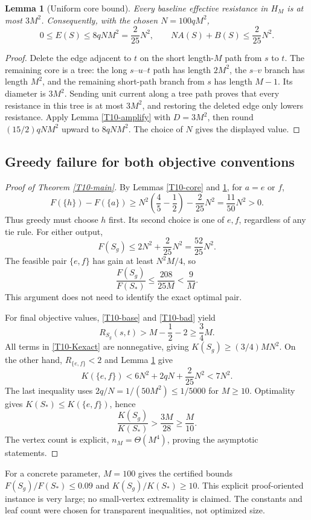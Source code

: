 \documentclass[11pt,a4paper]{article}
\newtheorem{lemma}[theorem]{Lemma}
\theoremstyle{definition}\newtheorem{definition}[theorem]{Definition}
\theoremstyle{remark}\newtheorem{remark}[theorem]{Remark}
\numberwithin{equation}{section}
\begin{document}
\begin{lemma}[Uniform core bound]\label{T10-diam}
Every baseline effective resistance in $H_M$ is at most $3M^2$. Consequently, with the chosen $N=100qM^2$,
\[
 0\le E(S)\le8qNM^2=\frac{2}{25}N^2,
 \qquad NA(S)+B(S)\le\frac{2}{25}N^2.
\]
\end{lemma}
\begin{proof}
Delete the edge adjacent to $t$ on the short length-$M$ path from $s$ to $t$. The remaining core is a tree: the long $s$--$u$--$t$ path has length $2M^2$, the $s$--$v$ branch has length $M^2$, and the remaining short-path branch from $s$ has length $M-1$. Its diameter is $3M^2$. Sending unit current along a tree path proves that every resistance in this tree is at most $3M^2$, and restoring the deleted edge only lowers resistance. Apply Lemma \ref{T10-amplify} with $D=3M^2$, then round $(15/2)qNM^2$ upward to $8qNM^2$. The choice of $N$ gives the displayed value.
\end{proof}

\subsection{Greedy failure for both objective conventions}\label{T10-sec-5}
\begin{proof}[Proof of Theorem \ref{T10-main}]
By Lemmas \ref{T10-core} and \ref{T10-diam}, for $a=e$ or $f$,
\[
 F(\{h\})-F(\{a\})
 \ge N^2\left(\frac45-\frac12\right)-\frac{2}{25}N^2
 =\frac{11}{50}N^2>0.
\]
Thus greedy must choose $h$ first. Its second choice is one of $e,f$, regardless of any tie rule. For either output,
\[
 F(S_g)\le2N^2+\frac{2}{25}N^2=\frac{52}{25}N^2.
\]
The feasible pair $\{e,f\}$ has gain at least $N^2M/4$, so
\[
 \frac{F(S_g)}{F(S_*)}\le\frac{208}{25M}<\frac9M.
\]
This argument does not need to identify the exact optimal pair.

For final objective values, \eqref{T10-base} and \eqref{T10-bad} yield
\[
 R_{S_g}(s,t)>M-\frac12-2\ge\frac34M.
\]
All terms in \eqref{T10-Kexact} are nonnegative, giving
$K(S_g)\ge(3/4)MN^2$.
On the other hand, $R_{\{e,f\}}<2$ and Lemma \ref{T10-diam} give
\[
 K(\{e,f\})<6N^2+2qN+\frac{2}{25}N^2<7N^2.
\]
The last inequality uses $2q/N=1/(50M^2)\le1/5000$ for $M\ge10$. Optimality gives $K(S_*)\le K(\{e,f\})$, hence
\[
 \frac{K(S_g)}{K(S_*)}>\frac{3M}{28}\ge\frac M{10}.
\]
The vertex count is explicit, $n_M=\Theta(M^4)$, proving the asymptotic statements.
\end{proof}
For a concrete parameter, $M=100$ gives the certified bounds $F(S_g)/F(S_*)\le0.09$ and $K(S_g)/K(S_*)\ge10$. This explicit proof-oriented instance is very large; no small-vertex extremality is claimed. The constants and leaf count were chosen for transparent inequalities, not optimized size.
\end{document}
